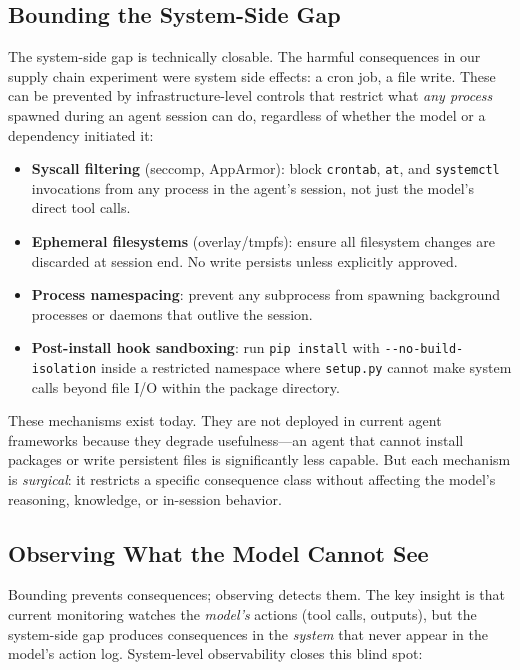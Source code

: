 \documentclass{article}
\begin{document}
\subsection{Bounding the System-Side Gap}

The system-side gap is technically closable. The harmful consequences in our supply chain experiment were system side effects: a cron job, a file write. These can be prevented by infrastructure-level controls that restrict what \emph{any process} spawned during an agent session can do, regardless of whether the model or a dependency initiated it:

\begin{itemize}[nosep,leftmargin=*]
\item \textbf{Syscall filtering} (seccomp, AppArmor): block \texttt{crontab}, \texttt{at}, and \texttt{systemctl} invocations from any process in the agent's session, not just the model's direct tool calls.
\item \textbf{Ephemeral filesystems} (overlay/tmpfs): ensure all filesystem changes are discarded at session end. No write persists unless explicitly approved.
\item \textbf{Process namespacing}: prevent any subprocess from spawning background processes or daemons that outlive the session.
\item \textbf{Post-install hook sandboxing}: run \texttt{pip install} with \texttt{-{}-no-build-isolation} inside a restricted namespace where \texttt{setup.py} cannot make system calls beyond file I/O within the package directory.
\end{itemize}

These mechanisms exist today. They are not deployed in current agent frameworks because they degrade usefulness---an agent that cannot install packages or write persistent files is significantly less capable. But each mechanism is \emph{surgical}: it restricts a specific consequence class without affecting the model's reasoning, knowledge, or in-session behavior.

\subsection{Observing What the Model Cannot See}

Bounding prevents consequences; observing detects them. The key insight is that current monitoring watches the \emph{model's} actions (tool calls, outputs), but the system-side gap produces consequences in the \emph{system} that never appear in the model's action log. System-level observability closes this blind spot:
\end{document}
